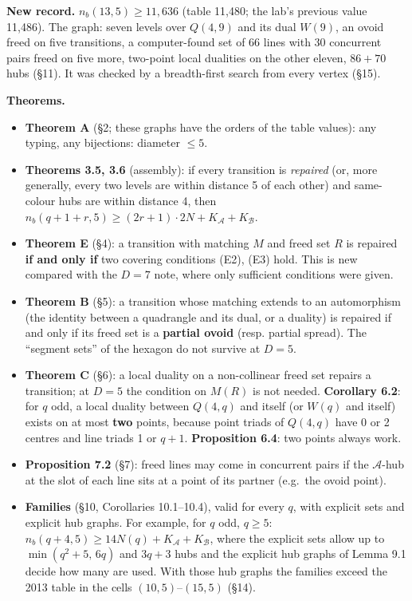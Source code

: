 \documentclass[
  11pt,
]{article}
\providecommand{\tightlist}{%
  \setlength{\itemsep}{0pt}\setlength{\parskip}{0pt}}
\begin{document}
\textbf{New record.} \(n_b(13,5)\ge 11{,}636\) (table 11,480; the lab's
previous value 11,486). The graph: seven levels over \(Q(4,9)\) and its
dual \(W(9)\), an ovoid freed on five transitions, a computer-found set
of 66 lines with 30 concurrent pairs freed on five more, two-point local
dualities on the other eleven, \(86+70\) hubs (§11). It was checked by a
breadth-first search from every vertex (§15).

\textbf{Theorems.}

\begin{itemize}
\tightlist
\item
  \textbf{Theorem A} (§2; these graphs have the orders of the table
  values): any typing, any bijections: diameter \(\le 5\).
\item
  \textbf{Theorems 3.5, 3.6} (assembly): if every transition is
  \emph{repaired} (or, more generally, every two levels are within
  distance 5 of each other) and same-colour hubs are within distance 4,
  then
  \(n_b(q+1+r,5)\ge (2r+1)\cdot 2N + K_{\mathcal A}+K_{\mathcal B}\).
\item
  \textbf{Theorem E} (§4): a transition with matching \(M\) and freed
  set \(R\) is repaired \textbf{if and only if} two covering conditions
  (E2), (E3) hold. This is new compared with the \(D=7\) note, where
  only sufficient conditions were given.
\item
  \textbf{Theorem B} (§5): a transition whose matching extends to an
  automorphism (the identity between a quadrangle and its dual, or a
  duality) is repaired if and only if its freed set is a \textbf{partial
  ovoid} (resp. partial spread). The ``segment sets'' of the hexagon do
  not survive at \(D=5\).
\item
  \textbf{Theorem C} (§6): a local duality on a non-collinear freed set
  repairs a transition; at \(D=5\) the condition on \(M(R)\) is not
  needed. \textbf{Corollary 6.2}: for \(q\) odd, a local duality between
  \(Q(4,q)\) and itself (or \(W(q)\) and itself) exists on at most
  \textbf{two} points, because point triads of \(Q(4,q)\) have 0 or 2
  centres and line triads 1 or \(q+1\). \textbf{Proposition 6.4}: two
  points always work.
\item
  \textbf{Proposition 7.2} (§7): freed lines may come in concurrent
  pairs if the \(\mathcal A\)-hub at the slot of each line sits at a
  point of its partner (e.g.~the ovoid point).
\item
  \textbf{Families} (§10, Corollaries 10.1--10.4), valid for every
  \(q\), with explicit sets and explicit hub graphs. For example, for
  \(q\) odd, \(q\ge 5\):
  \(n_b(q+4,5)\ge 14N(q)+K_{\mathcal A}+K_{\mathcal B}\), where the
  explicit sets allow up to \(\min(q^2+5,\,6q)\) and \(3q+3\) hubs and
  the explicit hub graphs of Lemma 9.1 decide how many are used. With
  those hub graphs the families exceed the 2013 table in the cells
  \((10,5)\)--\((15,5)\) (§14).
\end{itemize}
\end{document}
